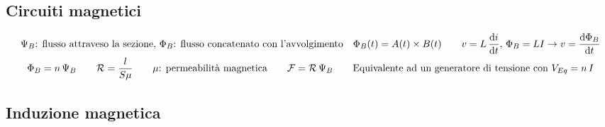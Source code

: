 \documentclass[10pt]{article}
\begin{document}
    \vspace{-3\baselineskip}
    \subsection*{Circuiti magnetici}
    \vspace{-1.45\baselineskip}

        \begin{gather*}
            \Psi_B \text{: flusso attraveso la sezione}, \, \Phi_B \text{: flusso concatenato con l'avvolgimento} \quad \Phi_B (t) = A(t) \times B(t) \qquad v = L \, \dv{i}{t}, \, \Phi_B = L I \rightarrow v = \dv{\Phi_B}{t}\\
            \Phi_B = n \, \Psi_B \qquad \mathcal{R} = \frac{l}{S \mu} \qquad \mu \text{: permeabilità magnetica} \qquad \mathcal{F} = \mathcal{R} \, \Psi_B \qquad \text{Equivalente ad un generatore di tensione con } V_{Eq} = n \, I
        \end{gather*}

    \vspace{-1.55\baselineskip}
    \subsection*{Induzione magnetica}
    \vspace{-.5\baselineskip}
\end{document}
